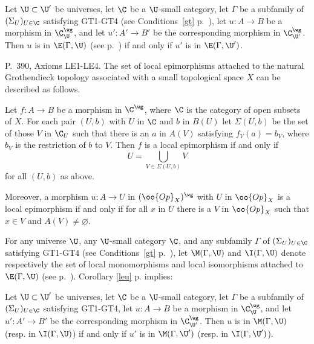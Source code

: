 \documentclass[12pt]{article}
\theoremstyle{remark}
\theoremstyle{definition}
\begin{document}
\begin{cor}
Let $\U\subset\U'$ be universes, let $\C$ be a $\U$-small category, let $\Gamma$ be a subfamily of $(\Sigma_U)_{U\in\C}$ satisfying GT1-GT4 (see Conditions~\ref{gt} p.~), let $u:A\to B$ be a morphism in $\C^\wg_\U$, and let $u':A'\to B'$ be the corresponding morphism in $\C^\wg_{\U'}$. Then $u$ is in $\E(\Gamma,\U)$ (see  p.~) if and only if $u'$ is in $\E(\Gamma,\U')$.
\end{cor}



\begin{s}
P.~390, Axioms LE1-LE4. The set of local epimorphisms attached to the natural Grothendieck topology associated with a small topological space $X$ can be described as follows. 

Let $f:A\to B$ be a morphism in $\C^\wg$, where $\C$ is the category of open subsets of $X$. For each pair $(U,b)$ with $U$ in $\C$ and $b$ in $B(U)$ let $\Sigma(U,b)$ be the set of those $V$ in $\C_U$ such that there is an $a$ in $A(V)$ satisfying $f_V(a)=b_V$, where $b_V$ is the restriction of $b$ to $V$. Then $f$ is a local epimorphism if and only if 
$$
U=\bigcup_{V\in\Sigma(U,b)}V
$$ 
for all $(U,b)$ as above.

Moreover, a morphism $u:A\to U$ in $(\oo{Op}_X)^\wg$ with $U$ in $\oo{Op}_X$ is a local epimorphism if and only if for all $x$ in $U$ there is a $V$ in $\oo{Op}_X$ such that $x\in V$ and $A(V)\ne\varnothing$. 
\end{s}


\begin{s}
For any universe $\U$, any $\U$-small category $\C$, and any subfamily $\Gamma$ of $(\Sigma_U)_{U\in\C}$ satisfying GT1-GT4 (see Conditions~\ref{gt} p.~), let $\M(\Gamma,\U)$ and $\I(\Gamma,\U)$ denote respectively the set of local monomorphisms and local isomorphisms attached to $\E(\Gamma,\U)$ (see  p.~). Corollary \ref{leu} p.  implies:

Let $\U\subset\U'$ be universes, let $\C$ be a $\U$-small category, let $\Gamma$ be a subfamily of $(\Sigma_U)_{U\in\C}$ satisfying GT1-GT4, let $u:A\to B$ be a morphism in $\C^\wg_\U$, and let $u':A'\to B'$ be the corresponding morphism in $\C^\wg_{\U'}$. Then $u$ is in $\M(\Gamma,\U)$ (resp. in $\I(\Gamma,\U)$) if and only if $u'$ is in $\M(\Gamma,\U')$ (resp. in $\I(\Gamma,\U')$).
\end{s}
\end{document}
